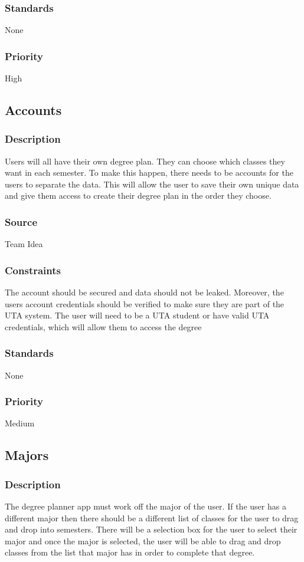 \subsubsection{Standards}
None
\subsubsection{Priority}
High

\subsection{Accounts}
\subsubsection{Description}
Users will all have their own degree plan. They can choose which classes they want in each semester. To make this happen, there needs to be accounts for the users to separate the data. This will allow the user to save their own unique data and give them access to create their degree plan in the order they choose. 
\subsubsection{Source}
Team Idea
\subsubsection{Constraints}
The account should be secured and data should not be leaked. Moreover, the users account credentials should be verified to make sure they are part of the UTA system. The user will need to be a UTA student or have valid UTA credentials, which will allow them to access the degree 
\subsubsection{Standards}
None
\subsubsection{Priority}
Medium

\subsection{Majors}
\subsubsection{Description}
The degree planner app must work off the major of the user. If the user has a different major then there should be a different list of classes for the user to drag and drop into semesters. There will be a selection box for the user to select their major and once the major is selected, the user will be able to drag and drop classes from the list that major has in order to complete that degree.  
